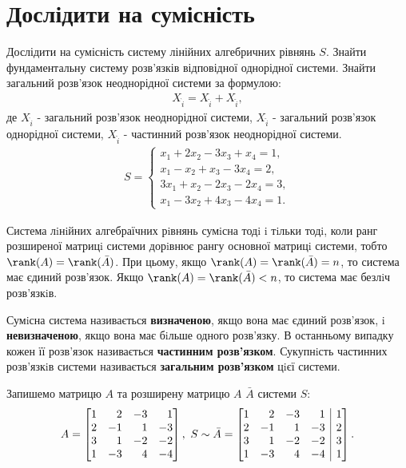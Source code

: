 \section{Дослідити на сумісність}
Дослідити на сумісність систему лінійних алгебричних рівнянь \(S\). Знайти фундаментальну систему розв'язків відповідної однорідної системи. Знайти загальний розв'язок неоднорідної системи за формулою:
\begin{gather}
	X_{\grave{i}}=X_{\hat{i}}+X_{\check{i}},
\end{gather}
де \(X_{\grave{i}}\) - загальний розв'язок неоднорідної системи, \(X_{\hat{i}}\) - загальний розв'язок однорідної системи, \(X_{\check{i}}\) - частинний розв'язок неоднорідної системи.
\begin{gather}
	S=\begin{cases}
		x_1+2x_2-3x_3+x_4=1,\\
		x_1-x_2+x_3-3x_4=2,\\
		3x_1+x_2-2x_3-2x_4=3,\\
		x_1-3x_2+4x_3-4x_4=1.
	\end{cases}
\end{gather}
\begin{thm}
	\label{thm:kronokerkapeli}
	Система лiнiйних алгебраїчних рiвнянь сумiсна тодi i тiльки тодi, коли ранг розширеної матрицi системи дорiвнює рангу основної матрицi системи, тобто \(\rank(A)=\rank(\bar{A})\). При цьому, якщо \(\rank(A)=\rank(\bar{A})=n\), то система має єдиний розв'язок. Якщо \(\rank(A)=\rank(\bar{A})<n\), то система має безлiч розв'язкiв.
\end{thm}
\begin{dfn}
	\label{dfn:roots}
	Сумiсна система називається {\bfseries визначеною}, якщо вона має єдиний розв'язок, i {\bfseries невизначеною}, якщо вона має бiльше одного розв'язку. В останньому випадку кожен її розв'язок називається {\bfseries частинним розв'язком}. Сукупнiсть частинних розв'язкiв системи називається {\bfseries загальним розв'язком} цiєї системи.
\end{dfn}
\solving
Запишемо матрицю \(A\) та розширену матрицю \(A\) \(\bar{A}\) системи \(S\):
\begin{gather}
	A=\begin{bmatrix*}[r]
		1&2&-3&1\\
		2&-1&1&-3\\
		3&1&-2&-2\\
		1&-3&4&-4
	\end{bmatrix*},\
	S\sim\bar{A}=\left[\begin{array}{@{}rrrr|r@{}}
		1&2&-3&1&1\\
		2&-1&1&-3&2\\
		3&1&-2&-2&3\\
		1&-3&4&-4&1
	\end{array}\right].
\end{gather}
